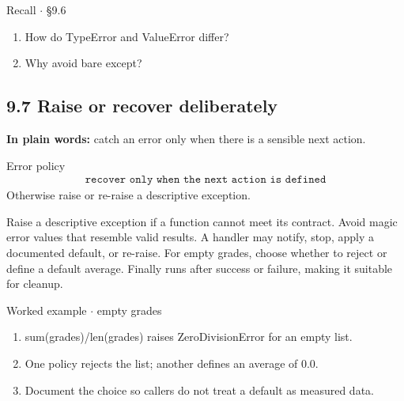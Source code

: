 \documentclass[11pt]{article}
\begin{document}
\begin{keepsection}
\begin{recallbox}{Recall \ensuremath{\cdot} §9.6}
\begin{enumerate}
\item How do TypeError and ValueError differ?
\item Why avoid bare except?
\end{enumerate}

\end{recallbox}
\end{keepsection}

\begin{keepsection}
\section{9.7 Raise or recover deliberately}

\begin{plainbox}\textbf{In plain words:} catch an error only when there is a sensible next action.\end{plainbox}

\begin{equationcard}{Error policy}
\[ \begin{gathered} \texttt{recover only when the next action is defined} \end{gathered} \]
{\small Otherwise raise or re-raise a descriptive exception.}
\end{equationcard}

Raise a descriptive exception if a function cannot meet its contract. Avoid magic error values that resemble valid results. A handler may notify, stop, apply a documented default, or re-raise. For empty grades, choose whether to reject or define a default average. Finally runs after success or failure, making it suitable for cleanup.

\begin{workedbox}{Worked example \ensuremath{\cdot} empty grades}
\begin{enumerate}
\item sum(grades)/len(grades) raises ZeroDivisionError for an empty list.
\item One policy rejects the list; another defines an average of 0.0.
\item Document the choice so callers do not treat a default as measured data.
\end{enumerate}
\end{workedbox}


\end{keepsection}
\end{document}
